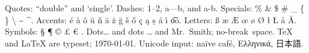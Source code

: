 \documentclass{article}
\begin{document}
Quotes: ``double'' and `single'. Dashes: 1--2, a---b, and a-b.
Specials: \% \& \$ \# \_ \{ \} \textbackslash{} \textasciitilde{} \textasciicircum{}.
Accents: \'e \`a \^o \"u \~n \=a \.z \u{g} \v{s} \H{o} \c{c} \k{a} \d{s} \r{a} \'{\i} \t{oo}.
Letters: \ss{} \ae{} \AE{} \oe{} \o{} \O{} \l{} \L{} \aa{} \AA.
Symbols: \S{} \P{} \dag{} \ddag{} \copyright{} \textregistered{} \texttrademark{} \pounds{} \euro{} \textdegree.
Dots\ldots{} and dots \dots{} and Mr.~Smith; no-break~space.
\TeX{} and \LaTeX{} are typeset; \today.
Unicode input: naïve café, Ελληνικά, 日本語.
\end{document}
